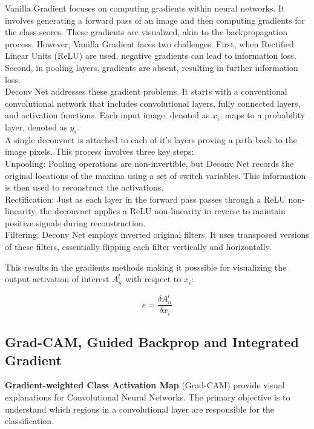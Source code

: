Vanilla Gradient \cite{simonyan2014deep} focuses on computing gradients within neural networks. It involves generating a forward pass of an image and then computing gradients for the class scores. These gradients are visualized, akin to the backpropagation process. However, Vanilla Gradient faces two challenges. First, when Rectified Linear Units (ReLU) are used, negative gradients can lead to information loss. Second, in pooling layers, gradients are absent, resulting in further information loss.
\\
Deconv Net \cite{zeiler2013visualizing}  addresses these gradient problems. It starts with a conventional convolutional network that includes convolutional layers, fully connected layers, and activation functions. Each input image, denoted as $x_i$, maps to a probability layer, denoted as $y_i$.
\\
A single deconvnet \cite{Zeiler2011AdaptiveDN} is attached to each of it's layers proving a path back to the image pixels. This process involves three key steps:
\\
Unpooling: Pooling operations are non-invertible, but Deconv Net records the original locations of the maxima using a set of switch variables. This information is then used to reconstruct the activations.\\

Rectification: Just as each layer in the forward pass passes through a ReLU non-linearity, the deconvnet applies a ReLU non-linearity in reverse to maintain positive signals during reconstruction.\\

Filtering: Deconv Net employs inverted original filters. It uses transposed versions of these filters, essentially flipping each filter vertically and horizontally.

This results in the gradients methods \cite{baehrens2010} making it posssible for visualizing the output activation of interest $A^l_n$ with respect to $x_i$:

$$ e = \frac{\delta A^l_n}{\delta x_i}$$


\subsection{Grad-CAM, Guided Backprop and Integrated Gradient}

\textbf{Gradient-weighted Class Activation Map} (Grad-CAM) provide visual explanations for Convolutional Neural Networks. The primary objective is to understand which regions in a convolutional layer are responsible for the classification. 

